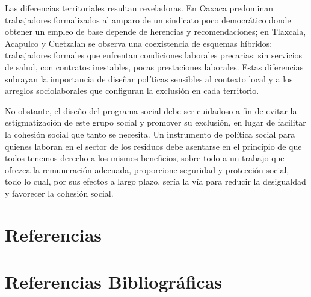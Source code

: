 \documentclass[
  spanish,
  11.5pt,
  170mm x 240mmpaper,
]{scrbook}
\begin{document}
Las diferencias territoriales resultan reveladoras. En Oaxaca predominan
trabajadores formalizados al amparo de un sindicato poco democrático
donde obtener un empleo de base depende de herencias y recomendaciones;
en Tlaxcala, Acapulco y Cuetzalan se observa una coexistencia de
esquemas híbridos: trabajadores formales que enfrentan condiciones
laborales precarias: sin servicios de salud, con contratos inestables,
pocas prestaciones laborales. Estas diferencias subrayan la importancia
de diseñar políticas sensibles al contexto local y a los arreglos
sociolaborales que configuran la exclusión en cada territorio.

No obstante, el diseño del programa social debe ser cuidadoso a fin de
evitar la estigmatización de este grupo social y promover su exclusión,
en lugar de facilitar la cohesión social que tanto se necesita. Un
instrumento de política social para quienes laboran en el sector de los
residuos debe asentarse en el principio de que todos tenemos derecho a
los mismos beneficios, sobre todo a un trabajo que ofrezca la
remuneración adecuada, proporcione seguridad y protección social, todo
lo cual, por sus efectos a largo plazo, sería la vía para reducir la
desigualdad y favorecer la cohesión social.


\chapter{Referencias}\label{referencias}

\chapter*{Referencias Bibliográficas}\label{bibliography}
\end{document}
